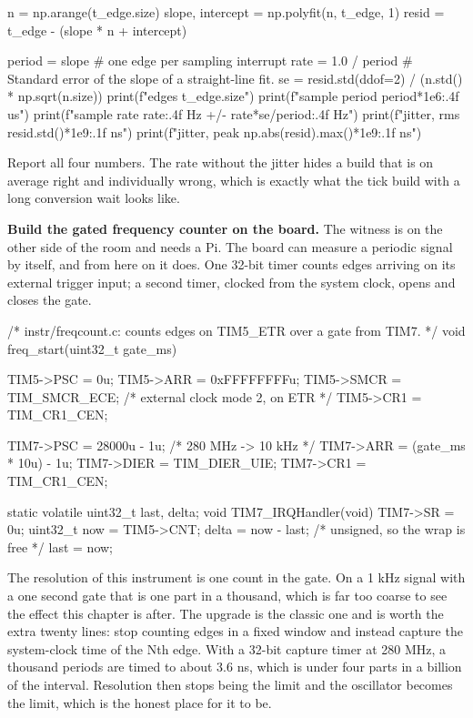 \begin{steps}
\begin{pycode}
n = np.arange(t_edge.size)
slope, intercept = np.polyfit(n, t_edge, 1)
resid = t_edge - (slope * n + intercept)

period = slope                      # one edge per sampling interrupt
rate = 1.0 / period
# Standard error of the slope of a straight-line fit.
se = resid.std(ddof=2) / (n.std() * np.sqrt(n.size))
print(f"edges           {t_edge.size}")
print(f"sample period   {period*1e6:.4f} us")
print(f"sample rate     {rate:.4f} Hz  +/- {rate*se/period:.4f} Hz")
print(f"jitter, rms     {resid.std()*1e9:.1f} ns")
print(f"jitter, peak    {np.abs(resid).max()*1e9:.1f} ns")
\end{pycode}
Report all four numbers. The rate without the jitter hides a build that is on
average right and individually wrong, which is exactly what the tick build with
a long conversion wait looks like.

\item \textbf{Build the gated frequency counter on the board.} The witness is
on the other side of the room and needs a Pi. The board can measure a periodic
signal by itself, and from here on it does. One 32-bit timer counts edges
arriving on its external trigger input; a second timer, clocked from the system
clock, opens and closes the gate.
\begin{ccode}
/* instr/freqcount.c: counts edges on TIM5_ETR over a gate from TIM7. */
void freq_start(uint32_t gate_ms)
{
    TIM5->PSC  = 0u;
    TIM5->ARR  = 0xFFFFFFFFu;
    TIM5->SMCR = TIM_SMCR_ECE;        /* external clock mode 2, on ETR */
    TIM5->CR1  = TIM_CR1_CEN;

    TIM7->PSC = 28000u - 1u;          /* 280 MHz -> 10 kHz */
    TIM7->ARR = (gate_ms * 10u) - 1u;
    TIM7->DIER = TIM_DIER_UIE;
    TIM7->CR1  = TIM_CR1_CEN;
}

static volatile uint32_t last, delta;
void TIM7_IRQHandler(void)
{
    TIM7->SR = 0u;
    uint32_t now = TIM5->CNT;
    delta = now - last;               /* unsigned, so the wrap is free */
    last  = now;
}
\end{ccode}
The resolution of this instrument is one count in the gate. On a 1 kHz signal
with a one second gate that is one part in a thousand, which is far too coarse
to see the effect this chapter is after. The upgrade is the classic one and is
worth the extra twenty lines: stop counting edges in a fixed window and instead
capture the system-clock time of the Nth edge. With a 32-bit capture timer at
280 MHz, a thousand periods are timed to about 3.6 ns, which is under four parts
in a billion of the interval. Resolution then stops being the limit and the
oscillator becomes the limit, which is the honest place for it to be.


\end{steps}
